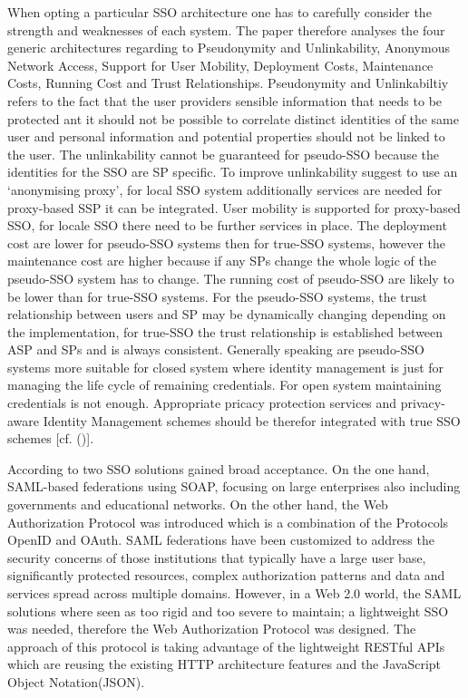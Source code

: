 {{When opting a particular SSO architecture one has to carefully consider the strength and weaknesses of each system. The paper therefore analyses the four generic architectures regarding to Pseudonymity and Unlinkability, Anonymous Network Access, Support for User Mobility, Deployment Costs, Maintenance Costs, Running Cost and Trust Relationships. Pseudonymity and Unlinkabiltiy refers to the fact that the user providers sensible information that needs to be protected ant it should not be possible to correlate distinct identities of the same user and personal information and potential properties should not be linked to the user. The unlinkability cannot be guaranteed for pseudo-SSO because the identities for the SSO are SP specific. To improve unlinkability   \cite{Pashalidis:2003:10.1007/3-540-45067-X_22} suggest to use an ‘anonymising proxy’, for local SSO system additionally services are needed for proxy-based SSP it can be integrated. User mobility is supported for proxy-based SSO, for locale SSO there need to be further services in place. The deployment cost are lower for pseudo-SSO systems then for true-SSO systems, however the maintenance cost are higher because if any SPs change the whole logic of the pseudo-SSO system has to change. The running cost of pseudo-SSO are likely to be lower than for true-SSO systems. For the pseudo-SSO systems, the trust relationship between users and SP may be dynamically changing depending on the implementation, for true-SSO the trust relationship is established between ASP and SPs and is always consistent. Generally speaking are pseudo-SSO systems more suitable for closed system where identity management is just for managing the life cycle of remaining credentials. For open system maintaining credentials is not enough. Appropriate pricacy protection services and privacy-aware Identity Management schemes should be therefor integrated with true SSO schemes [cf. (\cite{Pashalidis:2003:10.1007/3-540-45067-X_22})]. 


According to \cite{Lynch:2017:IIG} two SSO solutions gained broad acceptance. On the one hand, SAML-based federations using SOAP, focusing on large enterprises also including governments and educational networks. On the other hand, the Web Authorization Protocol was introduced which is a combination of the Protocols OpenID and OAuth. SAML federations have been customized to address the security concerns of those institutions that typically have a large user base, significantly protected resources, complex authorization patterns and data and services spread across multiple domains. However, in a Web 2.0 world, the SAML solutions where seen as too rigid and too severe to maintain; a lightweight SSO was needed, therefore the Web Authorization Protocol was designed. The approach of this protocol is taking advantage of the lightweight RESTful APIs which are reusing the existing HTTP architecture features and the JavaScript Object Notation(JSON).

}}
